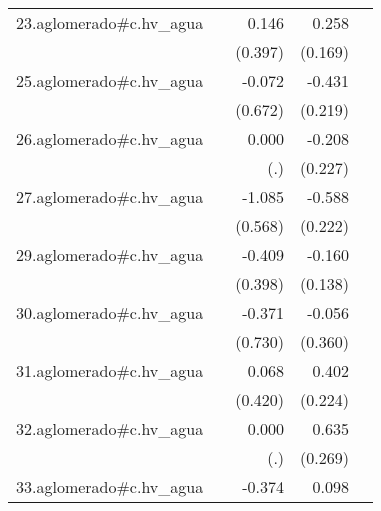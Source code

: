 {\begin{longtable}{l*{4}{D{.}{.}{-1}}}
\addlinespace
23.aglomerado#c.hv\_agua&                     &       0.146         &       0.258         &                     \\
            &                     &     (0.397)         &     (0.169)         &                     \\
\addlinespace
25.aglomerado#c.hv\_agua&                     &      -0.072         &      -0.431\sym{*}  &                     \\
            &                     &     (0.672)         &     (0.219)         &                     \\
\addlinespace
26.aglomerado#c.hv\_agua&                     &       0.000         &      -0.208         &                     \\
            &                     &         (.)         &     (0.227)         &                     \\
\addlinespace
27.aglomerado#c.hv\_agua&                     &      -1.085         &      -0.588\sym{**} &                     \\
            &                     &     (0.568)         &     (0.222)         &                     \\
\addlinespace
29.aglomerado#c.hv\_agua&                     &      -0.409         &      -0.160         &                     \\
            &                     &     (0.398)         &     (0.138)         &                     \\
\addlinespace
30.aglomerado#c.hv\_agua&                     &      -0.371         &      -0.056         &                     \\
            &                     &     (0.730)         &     (0.360)         &                     \\
\addlinespace
31.aglomerado#c.hv\_agua&                     &       0.068         &       0.402         &                     \\
            &                     &     (0.420)         &     (0.224)         &                     \\
\addlinespace
32.aglomerado#c.hv\_agua&                     &       0.000         &       0.635\sym{*}  &                     \\
            &                     &         (.)         &     (0.269)         &                     \\
\addlinespace
33.aglomerado#c.hv\_agua&                     &      -0.374         &       0.098         &                     \\

\end{longtable}}
